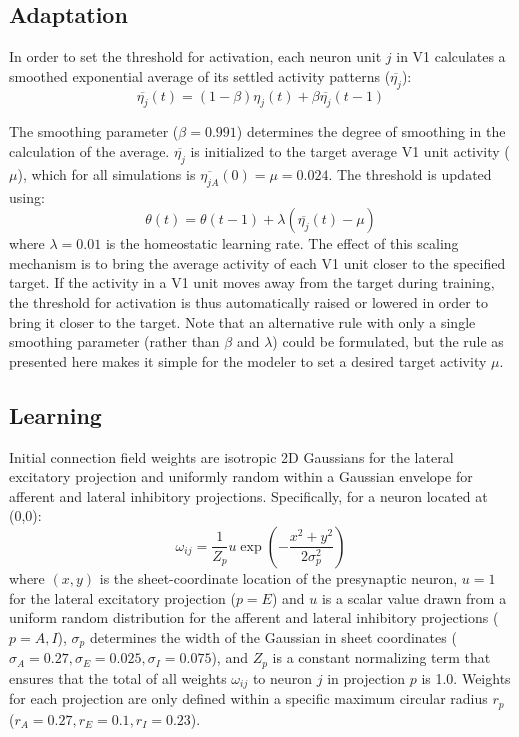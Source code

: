 \documentclass{article}
\begin{document}
\subsection*{Adaptation}

In order to set the threshold for activation, each neuron unit $j$ in V1
calculates a smoothed exponential average of its settled
  activity patterns ($\overline{\eta_{j}}$):
\begin{equation}
\overline{\eta_{j}}(t)= (1-\beta)\eta_{j}(t) + \beta\overline{\eta_{j}}(t-1)
\label{eqn:averaging}
\end{equation}

The smoothing parameter ($\beta=0.991$) determines the degree of
smoothing in the calculation of the average. $\overline{\eta_{j}}$ is
initialized to the target average V1 unit activity ($\mu$), which for
all simulations is $\overline{\eta_{jA}}(0) = \mu= 0.024$. The
threshold is updated using:
\begin{equation}
\label{eqn:thresholdupdate}%
\theta(t)= \theta(t-1) + \lambda(\overline{\eta_{j}}(t) -\mu)
\end{equation}
where $\lambda=0.01$ is the homeostatic learning rate. The effect of
this scaling mechanism is to bring the average activity of each V1
unit closer to the specified target. If the activity in a V1 unit
moves away from the target during training, the threshold for
activation is thus automatically raised or lowered in order to bring
it closer to the target. Note that an alternative rule with only a
single smoothing parameter (rather than $\beta$ and $\lambda$) could
be formulated, but the rule as presented here makes it simple for the
modeler to set a desired target activity $\mu$.

\subsection*{Learning}

Initial connection field weights are isotropic 2D Gaussians for the
lateral excitatory projection and uniformly random within a Gaussian envelope
for afferent and lateral inhibitory projections. Specifically, for a
neuron located at (0,0):
\begin{equation}
\omega_{ij}=\frac{1}{Z_p}u\exp\left(-\frac{x^{2}+y^{2}}{2\sigma_{p}^{2}}\right)
\label{eqn:gaussrandomweights}
\end{equation}
where $(x, y)$ is the sheet-coordinate location of the presynaptic
neuron, $u=1$ for the lateral excitatory projection ($p=E$) and $u$ is
a scalar value drawn from a uniform random distribution for the
afferent and lateral inhibitory projections ($p=A,I$), $\sigma_{p}$
determines the width of the Gaussian in sheet coordinates
($ \sigma_{A}=0.27, \sigma_{E}=0.025, \sigma_{I}=0.075$), and $Z_p$ is
a constant normalizing term that
ensures that the total of all weights $\omega_{ij}$ to neuron $j$ in
projection $p$ is 1.0.  Weights for
each projection are only defined within a specific maximum circular
radius $r_p$ ($r_{A}=0.27, r_{E}=0.1, r_{I}=0.23$).
\end{document}
